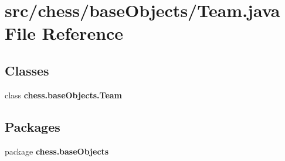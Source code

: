\section{src/chess/base\+Objects/\+Team.java File Reference}
\label{_team_8java}
\subsection*{Classes}
\begin{DoxyCompactItemize}
\item 
class {\bf chess.\+base\+Objects.\+Team}
\end{DoxyCompactItemize}
\subsection*{Packages}
\begin{DoxyCompactItemize}
\item 
package {\bf chess.\+base\+Objects}
\end{DoxyCompactItemize}
